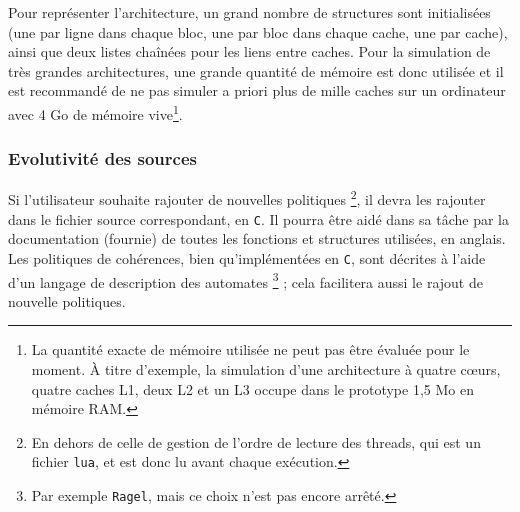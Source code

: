 Pour représenter l'architecture, un grand nombre de structures sont initialisées (une par ligne dans chaque bloc, une par bloc dans chaque cache, une par cache), ainsi que deux listes chaînées pour les liens entre caches. Pour la simulation de très grandes architectures, une grande quantité de mémoire est donc utilisée et il est recommandé de ne pas simuler a priori plus de mille caches sur un ordinateur avec 4 Go de mémoire vive\footnote{La quantité exacte de mémoire utilisée ne peut pas être évaluée pour le moment. \`A titre d'exemple, la simulation d'une architecture à quatre c\oe urs, quatre caches L1, deux L2 et un L3 occupe dans le prototype 1,5 Mo en mémoire RAM.}.

\subsubsection{Evolutivité des sources}

Si l'utilisateur souhaite rajouter de nouvelles politiques \footnote{En dehors de celle de gestion de l'ordre de lecture des threads, qui est un fichier \texttt{lua}, et est donc lu avant chaque exécution.}, il devra les rajouter dans le fichier source correspondant, en \texttt{C}. Il pourra être aidé dans sa tâche par la documentation (fournie) de toutes les fonctions et structures utilisées, en anglais. Les politiques de cohérences, bien qu'implémentées en \texttt{C}, sont décrites à l'aide d'un langage de description des automates \footnote{Par exemple \texttt{Ragel}, mais ce choix n'est pas encore arrêté.} ; cela facilitera aussi le rajout de nouvelle politiques.
